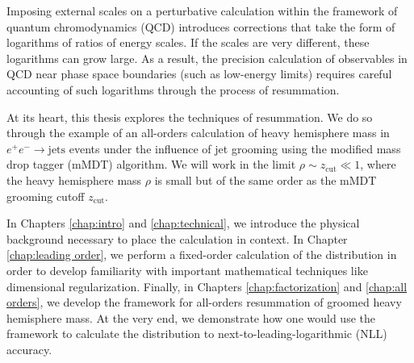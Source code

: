 \documentclass[../thesis.tex]{subfiles}
\providecommand{\zcut}{z_\mathrm{{cut}}}
\begin{document}
	Imposing external scales on a perturbative calculation within the framework of quantum chromodynamics (QCD) introduces corrections that take the form of logarithms of ratios of energy scales. If the scales are very different, these logarithms can grow large. As a result, the precision calculation of observables in QCD near phase space boundaries (such as low-energy limits) requires careful accounting of such logarithms through the process of resummation. 

	At its heart, this thesis explores the techniques of resummation. We do so through the example of an all-orders calculation of heavy hemisphere mass in $e^+ e^- \to \text{jets}$ events under the influence of jet grooming using the modified mass drop tagger (mMDT) algorithm. We will work in the limit $\rho \sim \zcut \ll 1$, where the heavy hemisphere mass $\rho$ is small but of the same order as the mMDT grooming cutoff $\zcut$.

	In Chapters \ref{chap:intro} and \ref{chap:technical}, we introduce the physical background necessary to place the calculation in context. In Chapter \ref{chap:leading order}, we perform a fixed-order calculation of the distribution in order to develop familiarity with important mathematical techniques like dimensional regularization. Finally, in Chapters \ref{chap:factorization} and \ref{chap:all orders}, we develop the framework for all-orders resummation of groomed heavy hemisphere mass. At the very end, we demonstrate how one would use the framework to calculate the distribution to next-to-leading-logarithmic (NLL) accuracy.
\end{document}
